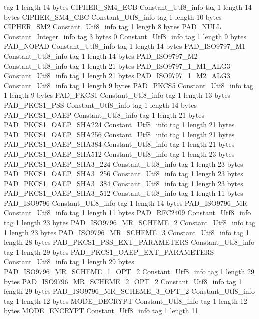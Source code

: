 {{{			tag	1
			length	14
			bytes	CIPHER_SM4_ECB
		}
		Constant_Utf8_info {
			tag	1
			length	14
			bytes	CIPHER_SM4_CBC
		}
		Constant_Utf8_info {
			tag	1
			length	10
			bytes	CIPHER_SM2
		}
		Constant_Utf8_info {
			tag	1
			length	8
			bytes	PAD_NULL
		}
		Constant_Integer_info {
			tag	3
			bytes	0
		}
		Constant_Utf8_info {
			tag	1
			length	9
			bytes	PAD_NOPAD
		}
		Constant_Utf8_info {
			tag	1
			length	14
			bytes	PAD_ISO9797_M1
		}
		Constant_Utf8_info {
			tag	1
			length	14
			bytes	PAD_ISO9797_M2
		}
		Constant_Utf8_info {
			tag	1
			length	21
			bytes	PAD_ISO9797_1_M1_ALG3
		}
		Constant_Utf8_info {
			tag	1
			length	21
			bytes	PAD_ISO9797_1_M2_ALG3
		}
		Constant_Utf8_info {
			tag	1
			length	9
			bytes	PAD_PKCS5
		}
		Constant_Utf8_info {
			tag	1
			length	9
			bytes	PAD_PKCS1
		}
		Constant_Utf8_info {
			tag	1
			length	13
			bytes	PAD_PKCS1_PSS
		}
		Constant_Utf8_info {
			tag	1
			length	14
			bytes	PAD_PKCS1_OAEP
		}
		Constant_Utf8_info {
			tag	1
			length	21
			bytes	PAD_PKCS1_OAEP_SHA224
		}
		Constant_Utf8_info {
			tag	1
			length	21
			bytes	PAD_PKCS1_OAEP_SHA256
		}
		Constant_Utf8_info {
			tag	1
			length	21
			bytes	PAD_PKCS1_OAEP_SHA384
		}
		Constant_Utf8_info {
			tag	1
			length	21
			bytes	PAD_PKCS1_OAEP_SHA512
		}
		Constant_Utf8_info {
			tag	1
			length	23
			bytes	PAD_PKCS1_OAEP_SHA3_224
		}
		Constant_Utf8_info {
			tag	1
			length	23
			bytes	PAD_PKCS1_OAEP_SHA3_256
		}
		Constant_Utf8_info {
			tag	1
			length	23
			bytes	PAD_PKCS1_OAEP_SHA3_384
		}
		Constant_Utf8_info {
			tag	1
			length	23
			bytes	PAD_PKCS1_OAEP_SHA3_512
		}
		Constant_Utf8_info {
			tag	1
			length	11
			bytes	PAD_ISO9796
		}
		Constant_Utf8_info {
			tag	1
			length	14
			bytes	PAD_ISO9796_MR
		}
		Constant_Utf8_info {
			tag	1
			length	11
			bytes	PAD_RFC2409
		}
		Constant_Utf8_info {
			tag	1
			length	23
			bytes	PAD_ISO9796_MR_SCHEME_2
		}
		Constant_Utf8_info {
			tag	1
			length	23
			bytes	PAD_ISO9796_MR_SCHEME_3
		}
		Constant_Utf8_info {
			tag	1
			length	28
			bytes	PAD_PKCS1_PSS_EXT_PARAMETERS
		}
		Constant_Utf8_info {
			tag	1
			length	29
			bytes	PAD_PKCS1_OAEP_EXT_PARAMETERS
		}
		Constant_Utf8_info {
			tag	1
			length	29
			bytes	PAD_ISO9796_MR_SCHEME_1_OPT_2
		}
		Constant_Utf8_info {
			tag	1
			length	29
			bytes	PAD_ISO9796_MR_SCHEME_2_OPT_2
		}
		Constant_Utf8_info {
			tag	1
			length	29
			bytes	PAD_ISO9796_MR_SCHEME_3_OPT_2
		}
		Constant_Utf8_info {
			tag	1
			length	12
			bytes	MODE_DECRYPT
		}
		Constant_Utf8_info {
			tag	1
			length	12
			bytes	MODE_ENCRYPT
		}
		Constant_Utf8_info {
			tag	1
			length	11
}}}
